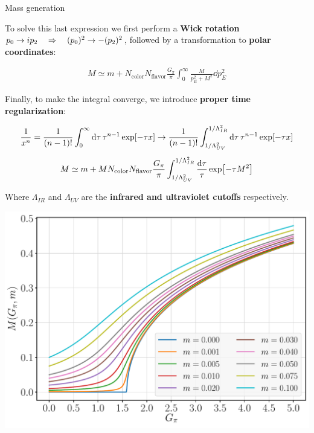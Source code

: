 \documentclass[9pt, handout, aspectratio=169]{beamer}	%
\begin{document}

\begin{frame}[allowframebreaks]{Mass generation}

	To solve this last expression we first perform a \textbf{Wick rotation} $p_0 \rightarrow i p_2 \quad \Rightarrow \quad (p_0)^2 \rightarrow - (p_2)^2$, followed by a transformation to \textbf{polar coordinates}:

	\begin{gather*}
		M \simeq
	    m + N_\text{color}  N_\text{flavor}
	    \frac{G_\pi}{\pi} \int_{0}^{\infty} \frac{M}{p_E^2 + M^2} \dd{p_E^2}
	\end{gather*}

	Finally, to make the integral converge, we introduce \textbf{proper time regularization}:

	\begin{gather*}
	  \frac{1}{x^n} =
	    \frac{1}{(n-1)!} \int_{0}^{\infty} \dd{\tau} \tau^{n-1} \exp[-\tau x] \rightarrow
	    \frac{1}{(n-1)!} \int_{1/\Lambda_{UV}^2}^{1/\Lambda_{IR}^2}
	      \dd{\tau} \tau^{n-1} \exp[-\tau x] \\[5pt]
	  M \simeq
	    m + M N_\text{color} N_\text{flavor} \frac{G_\pi}{\pi}
	    \int_{1/\Lambda_{UV}^2}^{1/\Lambda_{IR}^2} \frac{\dd{\tau}}{\tau}
	    \exp[-\tau M^{2}]
	\end{gather*}

	Where $\Lambda_{IR}$ and $\Lambda_{UV}$ are the \textbf{infrared and ultraviolet cutoffs} respectively.

\break

	\begin{center}
		\includegraphics[width=.5\paperwidth]{Figures/NJL1-model-solving/NJL1-dressed-mass-curves}
	\end{center}


\end{frame}
\end{document}

